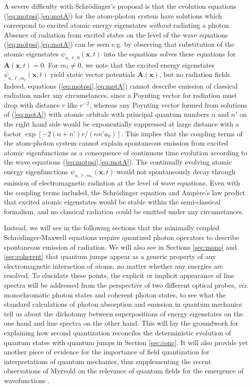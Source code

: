 \documentclass[final,3p,times,twocolumn]{elsarticle3}
\begin{document}
A severe difficulty with Schr\"odinger's proposal is that the evolution 
equations (\ref{eq:motpsi},\ref{eq:motA}) for the atom-photon system 
have solutions which correspond to excited atomic energy eigenstates 
{\it without} radiating a photon. Absence of radiation from excited states 
on the level of the wave equations (\ref{eq:motpsi},\ref{eq:motA}) can 
be seen e.g. by observing that substitution of the atomic 
eigenstates $\psi_{n,\ell,0}(\bm{x},t)$ into the equations solves these 
equations for $\bm{A}(\bm{x},t)=0$. For $m_\ell\neq 0$, 
we note that the excited energy eigenstates $\psi_{n,\ell,m_\ell}(\bm{x},t)$ 
yield static vector potentials $\bm{A}(\bm{x})$, but no radiation fields.
Indeed, equations (\ref{eq:motpsi},\ref{eq:motA})
cannot describe emission of classical radiation under any circumstances, since
a Poynting vector for radiation must drop with distance $r$ like $r^{-2}$, whereas
any Poynting vector formed from solutions of (\ref{eq:motA}) with atomic orbitals with
principal quantum numbers $n$ and $n'$ on the right hand side would be exponentially
suppressed at large distance with a factor $\exp[-2(n+n')r/(nn'a_0)]$. 
This implies that the coupling terms of the atom-photon 
system cannot explain spontaneous emission from excited atomic eigenfunctions as a 
consequence of continuous time evolution according to the wave 
equations (\ref{eq:motpsi},\ref{eq:motA}). 
The continually evolving atomic energy eigenfunctions $\psi_{n,\ell,m_\ell}(\bm{x},t)$
would not spontaneously decay through 
emission of electromagnetic radiation at the level of wave equations. 
Even with the coupling terms included, the Schr\"odinger equation and Amp\`{e}re's 
law predict that excited atomic eigenstates would be stable within the 
semi-classical formalism, and no classical radiation could be emitted under
any circumstances. 

Instead, we will see in the following sections that the minimally coupled
Schr\"odinger-Maxwell equations require quantized photon operators to describe
spontaneous emission of radiation. We will also 
see in Sections \ref{sec:mono} and \ref{sec:coherent} that quantum jumps appear as a 
generic property of any electromagnetic interaction of atoms, no matter whether any 
energies are resolved. To elucidate these points, the explicit
or implicit appearance of line spectra will be addressed from the perspective of two 
different optical probes, {\it viz.} monochromatic photon states and coherent photon states, 
to see what the standard calculations of 
photon absorption and emission in quantum mechanics tell us about the dichotomy between 
superpositions of energy eigenstates on the one hand and line spectra on the other hand. 
This will lay the groundwork for explaining how second quantization 
reconciles the deterministic evolution of quantum states with quantum jumps
in Section \ref{sec:conc}.
It will also provide yet another piece of evidence for the importance of field
quantization for interpretations of quantum mechanics, thus supplementing the recent
observations of Myrvold on the relevance of quantum fields for the emergence of 
wavefunctions \cite{myrvold}.
\end{document}
